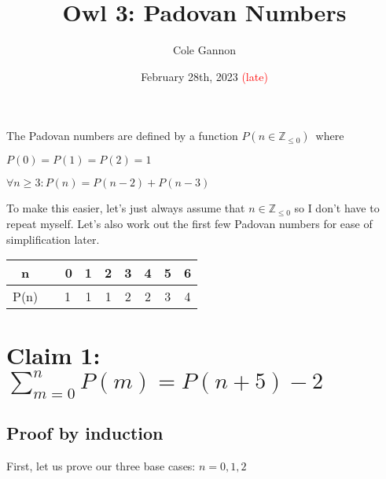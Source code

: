\documentclass[11pt]{article}
\title{Owl 3: Padovan Numbers}
\author{Cole Gannon}
\date{February 28th, 2023 \textcolor{red}{(late)}}
\def \nonneg {\mathbb{Z}_{\leq 0}}
\def \lf {\newline}
\begin{document}
\maketitle
The Padovan numbers are defined by a function ${P(n \in \nonneg)}$\ where\lf

$P(0)=P(1)=P(2)=1$\lf

$\forall n \geq 3:P(n)=P(n-2)+P(n-3)$\lf

To make this easier, let's just always assume that $n\in\nonneg$ so I don't have to repeat myself.
Let's also work out the first few Padovan numbers for ease of simplification later.  \lf

\begin{tabular}{||c c c c c c c c||}
   \hline n   &\vline\ \ 0 & 1 & 2 & 3 & 4 & 5 & 6 \\
   \hline P(n)&\vline\ \ 1 & 1 & 1 & 2 & 2 & 3 & 4 \\
   \hline
  \end{tabular}

\section*{Claim 1: $\displaystyle\sum_{m=0}^{n} P(m) = P(n+5)-2$}

\subsection*{Proof by induction}

First, let us prove our three base cases: $n=0,1,2$
\end{document}
